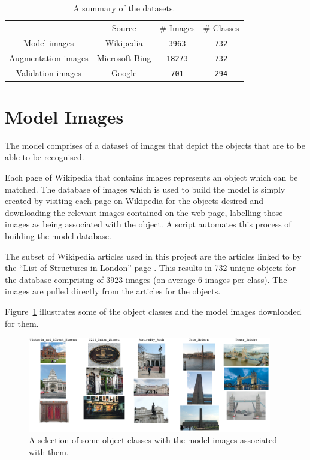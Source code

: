 \documentclass[11pt, onecolumn, a4paper, final]{report} %
\begin{document}
\begin{table}[hbtp]
\begin{center}
\begin{tabular}{c|c|c|c|}
\cline{2-4}
 & Source &  \# Images &  \# Classes \\ 
 \cline{1-4}
\multicolumn{1}{|c|}{Model images} & Wikipedia & \texttt{3963} & \texttt{732} \\  
\cline{1-4}
\multicolumn{1}{|c|}{Augmentation images} & Microsoft Bing & \texttt{18273} & \texttt{732} \\  
\cline{1-4}
\multicolumn{1}{|c|}{Validation images} & Google &  \texttt{701} & \texttt{294} \\  
\cline{1-4}
\end{tabular}
\end{center}
\caption{A summary of the datasets.}
\label{tbl:data}
\end{table}

\section{Model Images}
\label{sec:modelimages}
The model comprises of a dataset of images that depict the objects that are to be able to be recognised. 

Each page of Wikipedia that contains images represents an object which can be matched. The database of images which is used to build the model is simply created by visiting each page on Wikipedia for the objects desired and downloading the relevant images contained on the web page, labelling those images as being associated with the object. A script automates this process of building the model database.

The subset of Wikipedia articles used in this project are the articles linked to by the ``List of Structures in London'' page \cite{listofstructures}. This results in 732 unique objects for the database comprising of 3923 images (on average 6 images per class). The images are pulled directly from the articles for the objects.

Figure~\ref{fig:classes} illustrates some of the object classes and the model images downloaded for them.

\begin{figure}[!h]
\centering
\includegraphics[width=0.95\textwidth]{images/modelimages.png}
\caption{A selection of some object classes with the model images associated with them.}
\label{fig:classes}
\end{figure}
\end{document}
